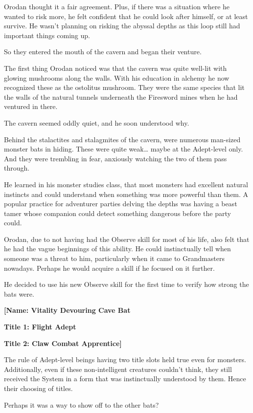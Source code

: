 \documentclass[a4paper,10pt]{book}
\begin{document}
Orodan thought it a fair agreement. Plus, if there was a situation where he wanted to risk more, he felt confident that he could look after himself, or at least survive. He wasn't planning on risking the abyssal depths as this loop still had important things coming up.\par
So they entered the mouth of the cavern and began their venture.\par
The first thing Orodan noticed was that the cavern was quite well-lit with glowing mushrooms along the walls. With his education in alchemy he now recognized these as the ostolitus mushroom. They were the same species that lit the walls of the natural tunnels underneath the Firesword mines when he had ventured in there.\par
The cavern seemed oddly quiet, and he soon understood why.\par
Behind the stalactites and stalagmites of the cavern, were numerous man-sized monster bats in hiding. These were quite weak… maybe at the Adept-level only. And they were trembling in fear, anxiously watching the two of them pass through.\par
He learned in his monster studies class, that most monsters had excellent natural instincts and could understand when something was more powerful than them. A popular practice for adventurer parties delving the depths was having a beast tamer whose companion could detect something dangerous before the party could.\par
Orodan, due to not having had the Observe skill for most of his life, also felt that he had the vague beginnings of this ability. He could instinctually tell when someone was a threat to him, particularly when it came to Grandmasters nowadays. Perhaps he would acquire a skill if he focused on it further.\par
He decided to use his new Observe skill for the first time to verify how strong the bats were.\par
\textbf{[Name: Vitality Devouring Cave Bat}\par
\textbf{Title 1: Flight Adept}\par
\textbf{Title 2: Claw Combat Apprentice]}\par
The rule of Adept-level beings having two title slots held true even for monsters. Additionally, even if these non-intelligent creatures couldn’t think, they still received the System in a form that was instinctually understood by them. Hence their choosing of titles.\par
Perhaps it was a way to show off to the other bats?\par
\end{document}
